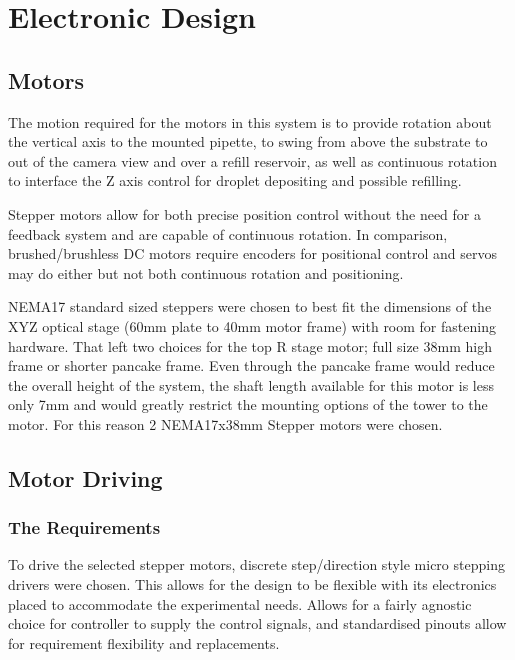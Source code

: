 \section{Electronic Design}

\subsection{Motors}
The motion required for the motors in this system is to provide rotation about the vertical axis to the mounted pipette, to swing from above the substrate to out of the camera view and over a refill reservoir, as well as continuous rotation to interface the Z axis control for droplet depositing and possible refilling.

Stepper motors allow for both precise position control without the need for a feedback system and are capable of continuous rotation. In comparison, brushed/brushless DC motors require encoders for positional control and servos may do either but not both continuous rotation and positioning.

NEMA17 standard sized steppers were chosen to best fit the dimensions of the XYZ optical stage (60mm plate to 40mm motor frame) with room for fastening hardware. That left two choices for the top R stage motor; full size 38mm high frame or shorter pancake frame. Even through the pancake frame would reduce the overall height of the system, the shaft length available for this motor is less only 7mm and would greatly restrict the mounting options of the tower to the motor. For this reason 2 NEMA17x38mm Stepper motors were chosen.

\subsection{Motor Driving}

\subsubsection*{The Requirements}
To drive the selected stepper motors, discrete step/direction style micro stepping drivers were chosen. This allows for the design to be flexible with its electronics placed to accommodate the experimental needs. Allows for a fairly agnostic choice for controller to supply the control signals, and standardised pinouts allow for requirement flexibility and replacements.

